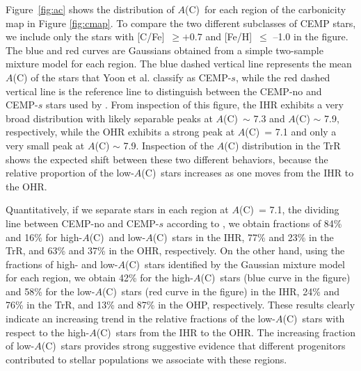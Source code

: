 \documentclass[iop]{emulateapj}
\newcommand*{\ac}{$A$(C)}
\newcommand*{\feh}{[Fe/H]}
\newcommand*{\cfe}{[C/Fe]}
\begin{document}
Figure~\ref{fig:ac} shows the distribution of \ac\ for each region of
the carbonicity map in Figure \ref{fig:cmap}. To compare the two
different subclasses of CEMP stars, we include only the stars with
\cfe\ $\geq +0.7$ and \feh\ $\leq$ --1.0 in the figure. The blue and red curves
are Gaussians obtained from a simple two-sample mixture model for each
region. The blue dashed vertical line represents the mean $A$(C) of the
stars that Yoon et al. classify as CEMP-$s$, while the red dashed vertical
line is the reference line to distinguish between the CEMP-no and
CEMP-$s$ stars used by \citet{yoon2016}. From inspection of this figure,
the IHR exhibits a very broad distribution with likely separable peaks
at \ac\ $\sim$ 7.3 and $A$(C) $\sim$ 7.9, respectively, while the OHR
exhibits a strong peak at \ac\ = 7.1 and only a very small peak at
$A$(C) $\sim$ 7.9. Inspection of the $A$(C) distribution in the TrR
shows the expected shift between these two different behaviors, because the
relative proportion of the low-\ac\ stars increases as one moves from the
IHR to the OHR.

Quantitatively, if we separate stars in each region at \ac\ = 7.1, the
dividing line between CEMP-no and CEMP-$s$ according to
\citet{yoon2016}, we obtain fractions of 84\% and 16\% for high-\ac\
and low-\ac\ stars in the IHR, 77\% and 23\% in the TrR, and 63\% and
37\% in the OHR, respectively. On the other hand, using the fractions of
high- and low-\ac\ stars identified by the Gaussian mixture model for
each region, we obtain 42\% for the high-\ac\ stars (blue curve in the
figure) and 58\% for the low-\ac\ stars (red curve in the figure) in the
IHR, 24\% and 76\% in the TrR, and 13\% and 87\% in the OHP,
respectively. These results clearly indicate an increasing trend in the
relative fractions of the low-\ac\ stars with respect to the high-\ac\
stars from the IHR to the OHR. The increasing fraction 
of low-\ac\ stars provides strong suggestive evidence that 
different progenitors contributed to stellar populations we 
associate with these regions.
\end{document}
